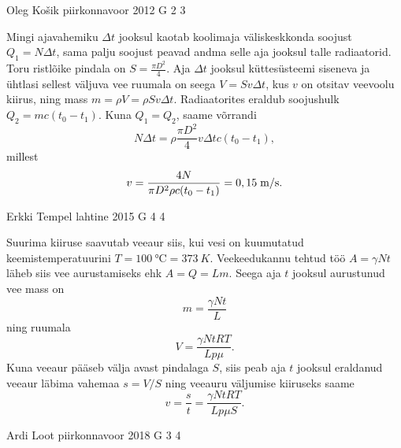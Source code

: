 \documentclass[11pt, twoside]{article}
\begin{document}
{%
{Oleg Košik} %
{piirkonnavoor} %
{2012} %
{G 2} %
{3} %
{

\ifSolution
Mingi ajavahemiku $\Delta t$ jooksul kaotab koolimaja väliskeskkonda soojust $Q_1=N\Delta t$, sama palju soojust peavad andma selle aja jooksul talle radiaatorid. Toru ristlõike pindala on $S=\frac{\pi D^2}{4}$. Aja $\Delta t$ jooksul küttesüsteemi siseneva ja ühtlasi sellest väljuva vee ruumala on seega $V=Sv\Delta t$, kus $v$ on otsitav veevoolu kiirus, ning mass $m=\rho V=\rho Sv\Delta t$. Radiaatorites eraldub soojushulk $Q_2=mc(t_0-t_1)$. Kuna $Q_1=Q_2$, saame võrrandi
\[
N\Delta t=\rho \frac{\pi D^2}{4}v\Delta t c (t_0-t_1),
\]
millest
\[
v=\frac{4N}{\pi D^2\rho c (t_0-t_1)}=0,15\;\hbox{m/s}.
\]
\fi
}

{Erkki Tempel} %
{lahtine} %
{2015} %
{G 4} %
{4} %
{

\ifSolution
Suurima kiiruse saavutab veeaur siis, kui vesi on kuumutatud keemistemperatuurini $T=\SI{100}{\celsius}=\SI{373}{K}$. Veekeedukannu tehtud töö $A=\gamma Nt$ läheb siis vee aurustamiseks ehk $A=Q=Lm$. Seega aja $t$ jooksul aurustunud vee mass on
\[
m=\frac{\gamma Nt}{L}
\]
ning ruumala
\[
V=\frac{\gamma NtRT}{Lp\mu}.
\]
Kuna veeaur pääseb välja avast pindalaga $S$, siis peab aja $t$ jooksul eraldanud veeaur läbima vahemaa $s=V/S$ ning veeauru väljumise kiiruseks saame
\[
v=\frac{s}{t}=\frac{\gamma NtRT}{Lp\mu S}.
\]
\fi
}

{Ardi Loot} %
{piirkonnavoor} %
{2018} %
{G 3} %
{4} %
{

}}
\end{document}
